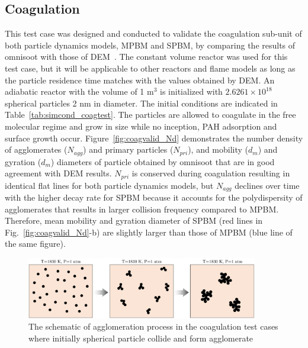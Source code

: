 \subsection{Coagulation}
This test case was designed and conducted to validate the coagulation sub-unit of both particle dynamics models, MPBM and SPBM, by comparing the results of omnisoot with those of DEM~\citep{kholghy2021surface}. The constant volume reactor was used for this test case, but it will be applicable to other reactors and flame models as long as the particle residence time matches with the values obtained by DEM. An adiabatic reactor with the volume of 1 $\mathrm{m^3}$ is initialized with $2.6261\times10^{18}$ spherical particles 2 nm in diameter. The initial conditions are indicated in Table~\ref{tab:simcond_coagtest}. The particles are allowed to coagulate in the free molecular regime and grow in size while no inception, PAH adsorption and surface growth occur. Figure~\ref{fig:coagvalid_Nd} demonstrates the number density of agglomerates (${N_{agg}}$) and primary particles (${N_{pri}}$), and mobility (${d_m}$) and gyration (${d_m}$) diameters of particle obtained by omnisoot that are in good agreement with DEM results. ${N_{pri}}$ is conserved during coagulation resulting in identical flat lines for both particle dynamics models, but ${N_{agg}}$ declines over time with the higher decay rate for SPBM because it accounts for the polydispersity of agglomerates that results in larger collision frequency compared to MPBM. Therefore, mean mobility and gyration diameter  of SPBM (red lines in Fig.~\ref{fig:coagvalid_Nd}-b) are slightly larger than those of MPBM (blue line of the same figure).

\begin{figure}[H]
	\centering
	\includegraphics[width=0.9\textwidth]{Figures/Results/Validation/Coagulation/coagulation_scheme.pdf}
	\caption{The schematic of agglomeration process in the coagulation test cases where initially spherical particle collide and form agglomerate}
	\label{fig:coagscheme}
\end{figure}

